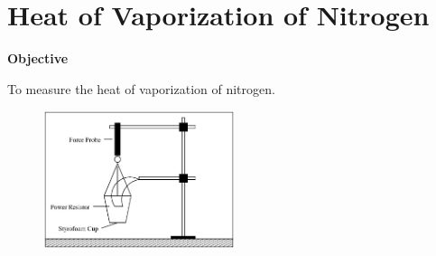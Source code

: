 
\section{Heat of Vaporization of Nitrogen}

\makelabheader %

\textbf{Objective}

To measure the heat of vaporization of nitrogen.

\begin{figure}
    \includegraphics[width=0.5\textwidth]{latent_heat_of_vaporization_of_nitrogen/heat_vap_nit_fig_1.eps}
\end{figure}

